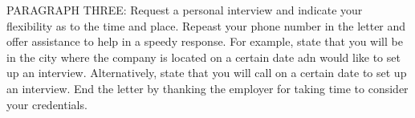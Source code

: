 PARAGRAPH THREE: Request a personal interview and indicate your flexibility as to the time and place. Repeast your phone number in the letter and offer assistance to help in a speedy response. For example, state that you will be in the city where the company is located on a certain date adn would like to set up an interview. Alternatively, state that you will call on a certain date to set up an interview. End the letter by thanking the employer for taking time to consider your credentials.